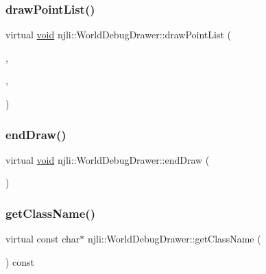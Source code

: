 \subsubsection{\texorpdfstring{draw\+Point\+List()}{drawPointList()}}
{\footnotesize\ttfamily virtual \mbox{\hyperlink{_thread_8h_af1e856da2e658414cb2456cb6f7ebc66}{void}} njli\+::\+World\+Debug\+Drawer\+::draw\+Point\+List (\begin{DoxyParamCaption}\item[{const dd\+::\+Draw\+Vertex $\ast$}]{,  }\item[{int}]{,  }\item[{bool}]{ }\end{DoxyParamCaption})\hspace{0.3cm}{\ttfamily [virtual]}}

\mbox{\label{classnjli_1_1_world_debug_drawer_ad0f3fbe3f3f062800792178a1b83318e}} 
\subsubsection{\texorpdfstring{end\+Draw()}{endDraw()}}
{\footnotesize\ttfamily virtual \mbox{\hyperlink{_thread_8h_af1e856da2e658414cb2456cb6f7ebc66}{void}} njli\+::\+World\+Debug\+Drawer\+::end\+Draw (\begin{DoxyParamCaption}{ }\end{DoxyParamCaption})\hspace{0.3cm}{\ttfamily [virtual]}}

\mbox{\label{classnjli_1_1_world_debug_drawer_a08488c8e987f18b7186d5ca50650db99}} 
\subsubsection{\texorpdfstring{get\+Class\+Name()}{getClassName()}}
{\footnotesize\ttfamily virtual const char$\ast$ njli\+::\+World\+Debug\+Drawer\+::get\+Class\+Name (\begin{DoxyParamCaption}{ }\end{DoxyParamCaption}) const\hspace{0.3cm}{\ttfamily [virtual]}}

